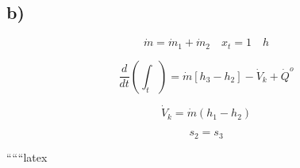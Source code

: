 

\subsection*{b)}

\[
\dot{m} = \dot{m}_1 + \dot{m}_2 \quad x_t = 1 \quad h
\]

\[
\frac{d}{dt} \left( \int_{t} \right) = \dot{m} \left[ h_3 - h_2 \right] - \dot{V}_k + \dot{Q}^o
\]

\[
\dot{V}_k = \dot{m} \left( h_1 - h_2 \right)
\]

\[
s_2 = s_3
\]

``````latex